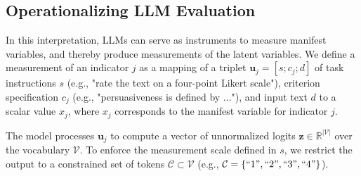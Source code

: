 




\subsection{Operationalizing LLM Evaluation}

In this interpretation, LLMs can serve as instruments to measure manifest variables, and thereby produce measurements of the latent variables. We define a measurement of an indicator $j$ as a mapping of a triplet $\mathbf{u}_j = [s; c_j; d]$ of task instructions $s$ (e.g., "rate the text on a four-point Likert scale"), criterion specification $c_j$ (e.g., "persuasiveness is defined by ..."), and input text $d$ to a scalar value $x_j$, where $x_j$ corresponds to the manifest variable for indicator $j$. 

The model processes $\mathbf{u}_j$ to compute a vector of unnormalized logits $\mathbf{z} \in \mathbb{R}^{|\mathcal{V}|}$ over the vocabulary $\mathcal{V}$. To enforce the measurement scale defined in $s$, we restrict the output to a constrained set of tokens $\mathcal{C} \subset \mathcal{V}$ (e.g., $\mathcal{C} = \{``1", ``2", ``3", ``4"\}$). 

